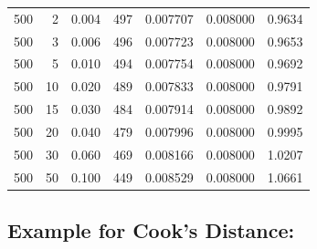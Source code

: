 \documentclass[
  letterpaper,
  DIV=11,
  numbers=noendperiod]{scrreprt}
\begin{document}
\begin{longtable}[]{@{}rrrrrrr@{}}
500 & 2 & 0.004 & 497 & 0.007707 & 0.008000 & 0.9634 \\
500 & 3 & 0.006 & 496 & 0.007723 & 0.008000 & 0.9653 \\
500 & 5 & 0.010 & 494 & 0.007754 & 0.008000 & 0.9692 \\
500 & 10 & 0.020 & 489 & 0.007833 & 0.008000 & 0.9791 \\
500 & 15 & 0.030 & 484 & 0.007914 & 0.008000 & 0.9892 \\
500 & 20 & 0.040 & 479 & 0.007996 & 0.008000 & 0.9995 \\
500 & 30 & 0.060 & 469 & 0.008166 & 0.008000 & 1.0207 \\
500 & 50 & 0.100 & 449 & 0.008529 & 0.008000 & 1.0661 \\
\end{longtable}

\subsection{Example for Cook's
Distance:}\label{example-for-cooks-distance}
\end{document}
